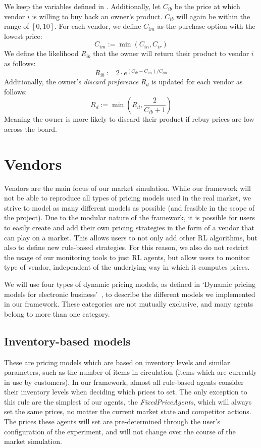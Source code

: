 \begin{definition}\label{def:ownerDecisions}
	We keep the variables defined in . Additionally, let \(C_{ib}\) be the price at which vendor \(i\) is willing to buy back an owner's product. \(C_{ib}\) will again be within the range of \([0,10]\). For each vendor, we define \(C_{im}\) as the purchase option with the lowest price:
	\[
		C_{im} := \min(C_{in}, C_{ir})
	\]
	We define the likelihood \(R_{ib}\) that the owner will return their product to vendor \(i\) as follows:
	\[
		R_{ib} := 2 \cdot e^{(C_{ib} - C_{im}) / C_{im}}
	\]
	Additionally, the owner's \emph{discard preference} \(R_{d}\) is updated for each vendor as follows:
	\[
		R_{d} := \min({R_{d}, \frac{2}{C_{ib}+1}})
	\]
	Meaning the owner is more likely to discard their product if rebuy prices are low across the board.
\end{definition}

\section{Vendors}\label{sec:ExplainVendors}

Vendors are the main focus of our market simulation. While our framework will not be able to reproduce all types of pricing models used in the real market, we strive to model as many different models as possible (and feasible in the scope of the project). Due to the modular nature of the framework, it is possible for users to easily create and add their own pricing strategies in the form of a vendor that can play on a market. This allows users to not only add other RL algorithms, but also to define new rule-based strategies. For this reason, we also do not restrict the usage of our monitoring tools to just RL agents, but allow users to monitor type of vendor, independent of the underlying way in which it computes prices.

We will use four types of dynamic pricing models, as defined in `Dynamic pricing models for electronic business'~\cite{dynamicPricingModels}, to describe the different models we implemented in our framework. These categories are not mutually exclusive, and many agents belong to more than one category.

\subsection{Inventory-based models}\label{subsec:InventoryBasedModels}

These are pricing models which are based on inventory levels and similar parameters, such as the number of items in circulation (items which are currently in use by customers). In our framework, almost all rule-based agents consider their inventory levels when deciding which prices to set. The only exception to this rule are the simplest of our agents, the \emph{FixedPriceAgents}, which will always set the same prices, no matter the current market state and competitor actions. The prices these agents will set are pre-determined through the user's configuration of the experiment, and will not change over the course of the market simulation.

